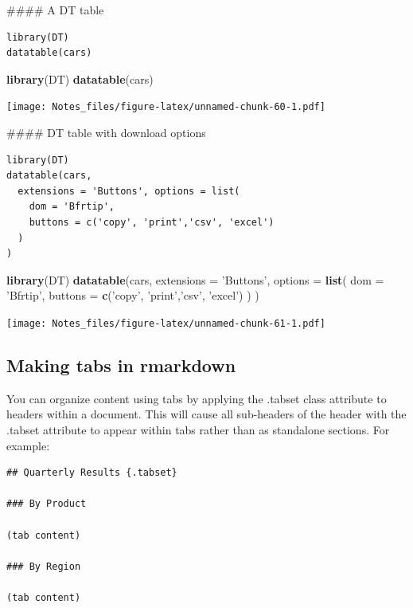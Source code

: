 \documentclass[
]{book}
\newenvironment{Shaded}{\begin{snugshade}}{\end{snugshade}}
\newcommand{\DataTypeTok}[1]{\textcolor[rgb]{0.13,0.29,0.53}{#1}}
\newcommand{\KeywordTok}[1]{\textcolor[rgb]{0.13,0.29,0.53}{\textbf{#1}}}
\newcommand{\NormalTok}[1]{#1}
\newcommand{\StringTok}[1]{\textcolor[rgb]{0.31,0.60,0.02}{#1}}
\begin{document}
\#\#\#\# A DT table

\begin{verbatim}
library(DT)
datatable(cars)
\end{verbatim}

\begin{Shaded}
\begin{Highlighting}[]
\KeywordTok{library}\NormalTok{(DT)}
\KeywordTok{datatable}\NormalTok{(cars)}
\end{Highlighting}
\end{Shaded}

\texttt{[image: Notes\_files/figure-latex/unnamed-chunk-60-1.pdf]}

\#\#\#\# DT table with download options

\begin{verbatim}
library(DT)
datatable(cars,
  extensions = 'Buttons', options = list(
    dom = 'Bfrtip',
    buttons = c('copy', 'print','csv', 'excel')
  )
)
\end{verbatim}

\begin{Shaded}
\begin{Highlighting}[]
\KeywordTok{library}\NormalTok{(DT)}
\KeywordTok{datatable}\NormalTok{(cars,}
           \DataTypeTok{extensions =} \StringTok{'Buttons'}\NormalTok{, }\DataTypeTok{options =} \KeywordTok{list}\NormalTok{(}
    \DataTypeTok{dom =} \StringTok{'Bfrtip'}\NormalTok{,}
    \DataTypeTok{buttons =} \KeywordTok{c}\NormalTok{(}\StringTok{'copy'}\NormalTok{, }\StringTok{'print'}\NormalTok{,}\StringTok{'csv'}\NormalTok{, }\StringTok{'excel'}\NormalTok{)}
\NormalTok{    )}
\NormalTok{)}
\end{Highlighting}
\end{Shaded}

\texttt{[image: Notes\_files/figure-latex/unnamed-chunk-61-1.pdf]}

\hypertarget{making-tabs-in-rmarkdown}{%
\subsection{Making tabs in rmarkdown}\label{making-tabs-in-rmarkdown}}

You can organize content using tabs by applying the .tabset class attribute to headers within a document. This will cause all sub-headers of the header with the .tabset attribute to appear within tabs rather than as standalone sections. For example:

\begin{verbatim}
## Quarterly Results {.tabset}

### By Product

(tab content)

### By Region

(tab content)
\end{verbatim}
\end{document}
